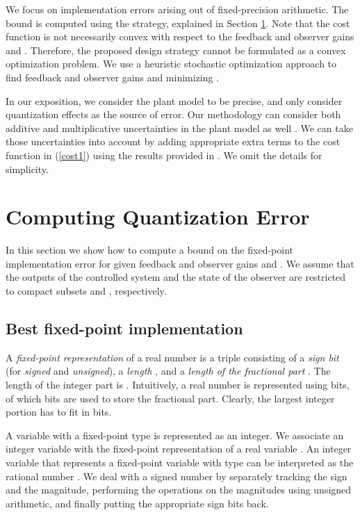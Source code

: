 \documentclass{amsart}
\numberwithin{equation}{section}
\begin{document}
We focus on implementation errors arising out of fixed-precision arithmetic. The bound  is computed using the strategy, explained in Section \ref{error_comp}. 
Note that the cost function  is not necessarily convex with respect to the feedback and observer gains  and . 
Therefore, the proposed design strategy cannot be formulated as a convex optimization problem. We use a heuristic stochastic optimization approach
to find feedback and observer gains  and  minimizing . 

In our exposition, we consider the plant model to be precise, and only consider quantization effects as the source of error.
Our methodology can consider both additive and multiplicative uncertainties in the plant model as well \cite{green}. 
We can take those uncertainties into account by adding appropriate extra terms to the cost function in (\ref{cost1}) 
using the results provided in \cite{majid1,majid2}. 
We omit the details for simplicity.

\section{Computing Quantization Error }\label{error_comp}

In this section we show how to compute a bound on the fixed-point implementation error for given feedback and observer gains  and . 
We assume that the outputs of the controlled system and the state of the observer are restricted to compact subsets  and , respectively. 

\subsection{Best fixed-point implementation}
A {\em fixed-point representation} of a real number is a triple  
consisting of a {\em sign bit}  (for {\em signed} and {\em unsigned}),
a {\em length} , and a {\em length of the fractional part} .
The length of the integer part is . 
Intuitively, a real number is represented using  bits, of which  bits are used to store
the fractional part.
Clearly, the largest integer portion has to fit in  bits.

A variable with a fixed-point type is represented as an integer. 
We associate an integer variable  with the fixed-point representation of a real variable .
An integer variable  that represents a fixed-point variable with type  
can be interpreted as the rational number .
We deal with a signed number by separately tracking the sign and the magnitude,
performing the operations on the magnitudes using unsigned arithmetic, and
finally putting the appropriate sign bits back.
\end{document}
